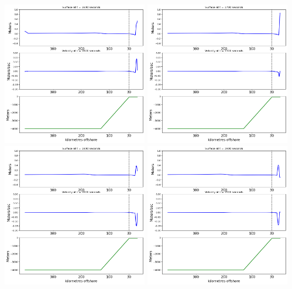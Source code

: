 \documentclass[11pt]{article}
\begin{document}
\vskip 10pt 
\includegraphics[width=0.475\textwidth]{frame0016fig2.png}
\vskip 10pt 
\includegraphics[width=0.475\textwidth]{frame0017fig2.png}
\vskip 10pt 
\includegraphics[width=0.475\textwidth]{frame0018fig2.png}
\vskip 10pt 
\includegraphics[width=0.475\textwidth]{frame0019fig2.png}
\end{document}

